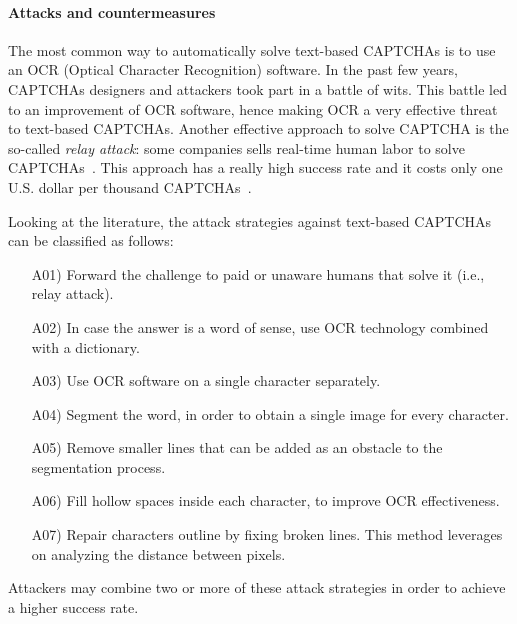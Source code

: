 \documentclass[conference]{IEEEtran}
\begin{document}
\paragraph{Attacks and countermeasures}
The most common way to automatically solve text-based CAPTCHAs is to use an OCR (Optical Character Recognition) software. 
In the past few years, CAPTCHAs designers and attackers took part in a battle of wits. This battle led to an improvement of OCR software, hence making OCR a very effective threat~\cite{chellapilla2005computers} to text-based CAPTCHAs.
Another effective approach to solve CAPTCHA is the so-called \textit{relay attack}: some companies sells real-time human labor to solve CAPTCHAs~\cite{motoyama2010re}.
This approach has a really high success rate and it costs only one U.S. dollar per thousand CAPTCHAs~\cite{bursztein2010good}. 

Looking at the literature, the attack strategies against text-based CAPTCHAs can be classified as follows:
\begin{enumerate}[leftmargin=1.cm]\item[A01)] Forward the challenge to paid or unaware humans that solve it (i.e., relay attack).
  \item[A02)] In case the answer is a word of sense, use OCR technology combined with a dictionary. \item[A03)] Use OCR software on a single character separately.
  \item[A04)] Segment the word, in order to obtain a single image for every character.
  \item[A05)] Remove smaller lines that can be added as an obstacle to the segmentation process. \item[A06)] Fill hollow spaces inside each character, to improve OCR effectiveness.
  \item[A07)] Repair characters outline by fixing broken lines. This method leverages on analyzing the distance between pixels. \end{enumerate}
Attackers may combine two or more of these attack strategies in order to achieve a higher success rate.
\end{document}
